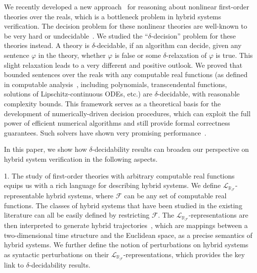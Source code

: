 \documentclass[envcountsect]{llncs}
\newcommand{\lrf}{\mathcal{L}_{\mathbb{R}_{\mathcal{F}}}}
\begin{document}
We recently developed a new approach~\cite{} for reasoning about
nonlinear first-order theories over the reals, which is a bottleneck problem in
hybrid systems verification. The decision problem for these nonlinear theories
are well-known to be very
hard or undecidable~\cite{}. We studied the
``$\delta$-decision'' problem for these
theories instead. A theory is $\delta$-decidable, if an algorithm can decide, 
given any sentence $\varphi$ in the theory, whether $\varphi$ is
false or some $\delta$-relaxation of $\varphi$ is true. This slight relaxation
 leads to a very different and positive outlook.
We proved
that bounded
sentences over the reals with any computable real functions (as
defined in computable analysis~\cite{CAbook}, including polynomials,
transcendental functions, solutions of Lipschitz-continuous ODEs, etc.) are
$\delta$-decidable, with reasonable complexity bounds. This framework serves as
a theoretical basis for the development of numerically-driven decision
procedures, which can exploit the full power of efficient numerical algorithms
and still provide formal correctness guarantees. Such solvers
have shown very promising performance~\cite{}.

In this paper, we show how $\delta$-decidability results can broaden our
perspective on hybrid system verification in the following aspects.

1. The study of first-order theories with arbitrary computable real
functions equips us with a rich language for describing hybrid systems.
We define $\lrf$-representable hybrid systems,
where $\mathcal{F}$ can be any set of computable real functions. The classes of
hybrid systems that have been studied in the existing literature can all be
easily defined by restricting $\mathcal{F}$. The $\lrf$-representations are then
interpreted to generate hybrid trajectories~\cite{}, which are mappings between
a two-dimensional time structure and the Euclidean space, as a precise semantics
of hybrid systems. We further define the notion of perturbations on hybrid
systems as syntactic perturbations on their $\lrf$-representations, which
provides the key link to $\delta$-decidability results. 
\end{document}
